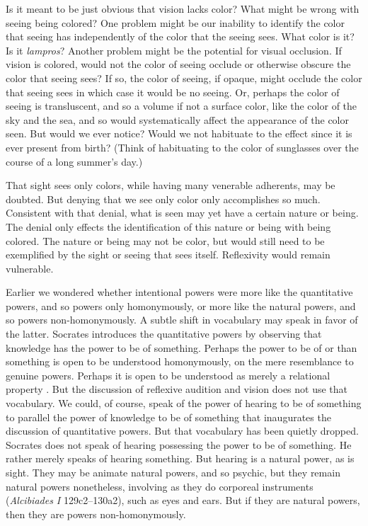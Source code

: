 Is it meant to be just obvious that vision lacks color? What might be wrong with seeing being colored? One problem might be our inability to identify the color that seeing has independently of the color that the seeing sees. What color is it? Is it \emph{lampros}? Another problem might be the potential for visual occlusion. If vision is colored, would not the color of seeing occlude or otherwise obscure the color that seeing sees? If so, the color of seeing, if opaque, might occlude the color that seeing sees in which case it would be no seeing. Or, perhaps the color of seeing is transluscent, and so a volume if not a surface color, like the color of the sky and the sea, and so would systematically affect the appearance of the color seen. But would we ever notice? Would we not habituate to the effect since it is ever present from birth? (Think of habituating to the color of sunglasses over the course of a long summer's day.)

That sight sees only colors, while having many venerable adherents, may be doubted. But denying that we see only color only accomplishes so much. Consistent with that denial, what is seen may yet have a certain nature or being. The denial only effects the identification of this nature or being with being colored. The nature or being may not be color, but would still need to be exemplified by the sight or seeing that sees itself. Reflexivity would remain vulnerable.

Earlier we wondered whether intentional powers were more like the quantitative powers, and so powers only homonymously, or more like the natural powers, and so powers non-homonymously. A subtle shift in vocabulary may speak in favor of the latter. Socrates introduces the quantitative powers by observing that knowledge has the power to be of something. Perhaps the power to be of or than something is open to be understood homonymously, on the mere resemblance to genuine powers. Perhaps it is open to be understood as merely a relational property \citep[24 n74]{Moore:2019aa}. But the discussion of reflexive audition and vision does not use that vocabulary. We could, of course, speak of the power of hearing to be of something to parallel the power of knowledge to be of something that inaugurates the discussion of quantitative powers. But that vocabulary has been quietly dropped. Socrates does not speak of hearing possessing the power to be of something. He rather merely speaks of hearing something. But hearing is a natural power, as is sight. They may be animate natural powers, and so psychic, but they remain natural powers nonetheless, involving as they do corporeal instruments (\emph{Alcibiades I} 129c2–130a2), such as eyes and ears. But if they are natural powers, then they are powers non-homonymously.

